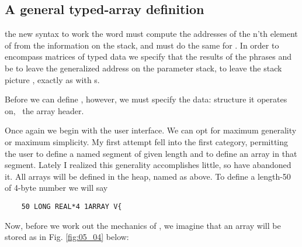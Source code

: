 \subsection{A general typed-array definition}
 the new syntax to work the word \bc{\}} must compute the addresses of the n'th element of  from the information on the stack, and \bc{\}\}} must do the same for . In order to encompass matrices of typed data we specify that the results of the phrases and  be to leave the generalized address on the parameter stack, \ie to leave the stack picture , exactly as with s.

Before we can define \bc{\}}, however, we must specify the data: structure it operates on, \ie\ the array header.

Once again we begin with the user interface. We can opt for maximum generality or maximum simplicity. My first attempt fell into the first category, permitting the user to define a named segment of given length and to define an array in that segment. Lately I realized this generality accomplishes little, so have abandoned it. All arrays will be defined in the heap, named  as above. To define a length-50  of 4-byte number we will say

\begin{lstlisting}
    50 LONG REAL*4 1ARRAY V{
\end{lstlisting}

Now, before we work out the mechanics of , we imagine that an array will be stored as in Fig. \ref{fig:05_04} below:

